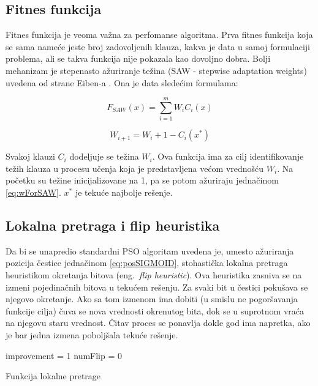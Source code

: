 \documentclass{article}
\begin{document}
\subsection{Fitnes funkcija}
Fitnes funkcija je veoma važna za perfomanse algoritma.
Prva fitnes funkcija koja se sama nameće jeste broj zadovoljenih klauza, kakva je data u samoj formulaciji problema, ali se takva funkcija nije pokazala kao dovoljno dobra. Bolji mehanizam je stepenasto ažuriranje težina (SAW - stepwise adaptation weights) uvedena od strane Eiben-a \cite{fitnes}. Ona je data sledećim formulama:

\begin{equation}\label{eq:SAW}
F_{SAW}(x) = \sum_{i=1}^{m} W_iC_i(x)
\end{equation}

\begin{equation}\label{eq:wForSAW}
W_{i+1} = W_{i} + 1 - C_i(x^*)
\end{equation}

Svakoj klauzi $C_i$ dodeljuje se težina $W_i$. Ova funkcija ima za cilj identifikovanje težih klauza u procesu učenja koja je predstavljena većom vrednošću $W_i$. Na početku su težine inicijalizovane na 1, pa se potom ažuriraju jednačinom \ref{eq:wForSAW}. $x^*$ je tekuće najbolje rešenje.


\subsection{Lokalna pretraga i flip heuristika}
Da bi se unapredio standardni PSO algoritam uvedena je, umesto ažuriranja pozicija čestice jednačinom \ref{eq:posSIGMOID}, stohastička lokalna pretraga heuristikom okretanja bitova (eng.~{\em flip heuristic}).
Ova heuristika zasniva se na izmeni pojedinačnih bitova u tekućem rešenju. Za svaki bit u čestici pokušava se njegovo okretanje. Ako sa tom izmenom ima dobiti (u smislu ne pogoršavanja funkcije cilja) čuva se nova vrednosti okrenutog bita, dok se u suprotnom vraća na njegovu staru vrednost. 
Čitav proces se ponavlja dokle god ima napretka, ako je bar jedna izmena poboljšala tekuće rešenje.


\begin{algorithm}[H]
\SetAlgoLined
{}

\BlankLine
 improvement = 1\;
 numFlip = 0\;
 \caption{Funkcija lokalne pretrage}
\end{algorithm}
\end{document}
